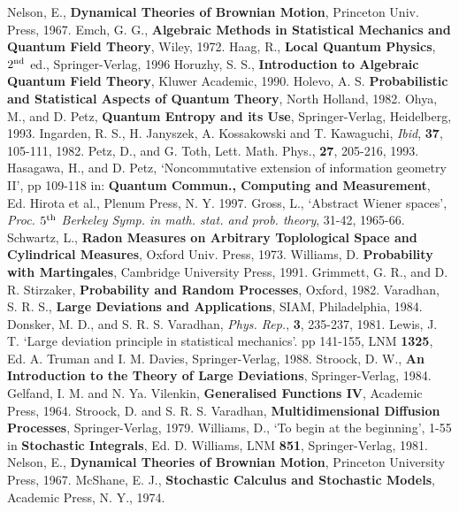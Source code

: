  Nelson, E., {\bf Dynamical Theories of Brownian Motion},
Princeton Univ. Press, 1967.
 Emch, G. G., {\bf Algebraic Methods in Statistical Mechanics
and Quantum Field Theory}, Wiley, 1972.
 Haag, R., {\bf Local Quantum Physics}, $2^{\rm nd}$ ed.,
Springer-Verlag, 1996
 Horuzhy, S. S., {\bf Introduction to Algebraic Quantum
Field Theory}, Kluwer Academic, 1990.
 Holevo, A. S. {\bf Probabilistic and Statistical Aspects
of Quantum Theory}, North Holland, 1982.
 Ohya, M., and D. Petz, {\bf Quantum Entropy and its Use},
Springer-Verlag, Heidelberg, 1993.
 Ingarden, R. S., H. Janyszek, A. Kossakowski and
T. Kawaguchi, {\em Ibid}, {\bf 37}, 105-111, 1982.
 Petz, D., and G. Toth, Lett. Math. Phys., {\bf 27}, 205-216,
1993.
 Hasagawa, H., and D. Petz, `Noncommutative extension of
information geometry II', pp 109-118 in: {\bf Quantum Commun., Computing and
Measurement}, Ed. Hirota et al., Plenum Press, N. Y. 1997.
 Gross, L., `Abstract Wiener spaces',
{\em Proc. $5^{\rm th}$ Berkeley Symp. in math. stat. and prob. theory},
31-42, 1965-66.
 Schwartz, L., {\bf Radon Measures on Arbitrary
Toplological Space and Cylindrical Measures}, Oxford Univ. Press, 1973.
 Williams, D. {\bf Probability with Martingales},
Cambridge University Press, 1991.
 Grimmett, G. R., and D. R. Stirzaker, {\bf
Probability and Random Processes}, Oxford, 1982.
 Varadhan, S. R. S., {\bf Large Deviations and
Applications}, SIAM, Philadelphia, 1984.
 Donsker, M. D., and S. R. S. Varadhan, {\em Phys. Rep.},
{\bf 3}, 235-237, 1981.
 Lewis, J. T. `Large deviation principle in statistical
mechanics'. pp 141-155, LNM {\bf 1325}, Ed. A. Truman and I. M. Davies,
Springer-Verlag, 1988.
 Stroock, D. W., {\bf An Introduction to the Theory
of Large Deviations}, Springer-Verlag, 1984.
 Gelfand, I. M. and N. Ya. Vilenkin, {\bf Generalised
Functions IV}, Academic Press, 1964.
 Stroock, D. and S. R. S. Varadhan, {\bf Multidimensional
Diffusion Processes}, Springer-Verlag, 1979.
 Williams, D., `To begin at the beginning', 1-55 in
{\bf Stochastic Integrals}, Ed. D. Williams, LNM {\bf 851}, Springer-Verlag,
1981.
 Nelson, E., {\bf Dynamical Theories of Brownian Motion},
Princeton University Press, 1967.
 McShane, E. J., {\bf Stochastic Calculus and Stochastic
Models}, Academic Press, N. Y., 1974.
